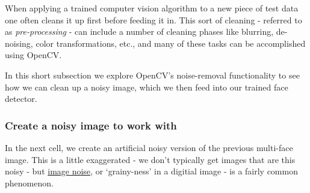 \documentclass[11pt]{article}
\begin{document}
When applying a trained computer vision algorithm to a new piece of test
data one often cleans it up first before feeding it in. This sort of
cleaning - referred to as \emph{pre-processing} - can include a number
of cleaning phases like blurring, de-noising, color transformations,
etc., and many of these tasks can be accomplished using OpenCV.

In this short subsection we explore OpenCV's noise-removal functionality
to see how we can clean up a noisy image, which we then feed into our
trained face detector.

    \hypertarget{create-a-noisy-image-to-work-with}{%
\subsubsection{Create a noisy image to work
with}\label{create-a-noisy-image-to-work-with}}

In the next cell, we create an artificial noisy version of the previous
multi-face image. This is a little exaggerated - we don't typically get
images that are this noisy - but
\href{https://digital-photography-school.com/how-to-avoid-and-reduce-noise-in-your-images/}{image
noise}, or `grainy-ness' in a digitial image - is a fairly common
phenomenon.
\end{document}
